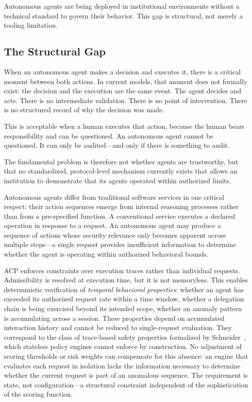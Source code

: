 \documentclass[11pt]{article}
\theoremstyle{definition}
\begin{document}
Autonomous agents are being deployed in institutional environments without a technical standard to govern their behavior.
This gap is structural, not merely a tooling limitation.

\subsection{The Structural Gap}

When an autonomous agent makes a decision and executes it, there is a critical moment between both actions.
In current models, that moment does not formally exist: the decision and the execution are the same event.
The agent decides and acts. There is no intermediate validation.
There is no point of intervention. There is no structured record of why the decision was made.

This is acceptable when a human executes that action, because the human bears responsibility and can be questioned.
An autonomous agent cannot be questioned. It can only be audited---and only if there is something to audit.

The fundamental problem is therefore not whether agents are trustworthy, but that no standardized, protocol-level mechanism currently exists that allows an institution to demonstrate that its agents operated within authorized limits.

Autonomous agents differ from traditional software services in one critical respect:
their action sequences emerge from internal reasoning processes rather than from a pre-specified
function.
A conventional service executes a declared operation in response to a request.
An autonomous agent may produce a sequence of actions whose security relevance only becomes
apparent across multiple steps---a single request provides insufficient information to determine
whether the agent is operating within authorized behavioral bounds.

ACP enforces constraints over execution traces rather than individual requests.
Admissibility is resolved at execution time, but it is not memoryless.
This enables deterministic verification of \emph{temporal behavioral properties}: whether an agent
has exceeded its authorized request rate within a time window, whether a delegation chain is being
exercised beyond its intended scope, whether an anomaly pattern is accumulating across a session.
These properties depend on accumulated interaction history and cannot be reduced to single-request
evaluation.
They correspond to the class of trace-based safety properties formalized by
Schneider~\cite{schneider2000enforceable}, which stateless policy engines cannot enforce by
construction.
No adjustment of scoring thresholds or risk weights can compensate for this absence:
an engine that evaluates each request in isolation lacks the information necessary to determine
whether the current request is part of an anomalous sequence.
The requirement is state, not configuration---a structural constraint independent of the
sophistication of the scoring function.
\end{document}

